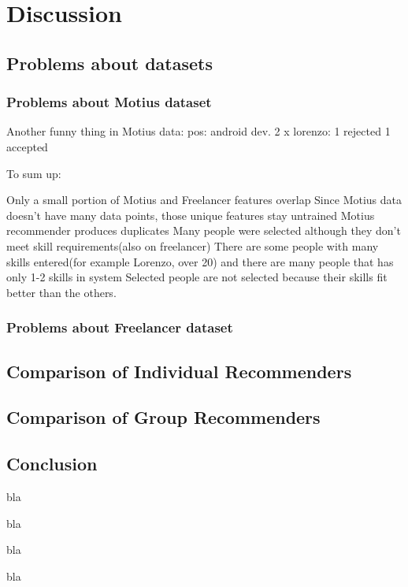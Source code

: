 
\chapter{Discussion}\label{chapter:discussion}

\section{Problems about datasets}

\subsection{Problems about Motius dataset}

Another funny thing in Motius data: pos: android dev. 2 x lorenzo: 1 rejected 1 accepted

To sum up:

Only a small portion of Motius and Freelancer features overlap
Since Motius data doesn't have many data points, those unique features stay untrained
Motius recommender produces duplicates
Many people were selected although they don't meet skill requirements(also on freelancer)
There are some people with many skills entered(for example Lorenzo, over 20) and there are many people that has only 1-2 skills in system
Selected people are not selected because their skills fit better than the others.

\subsection{Problems about Freelancer dataset}

\section{Comparison of Individual Recommenders}

\section{Comparison of Group Recommenders}


\section{Conclusion}

bla

bla

bla

bla
